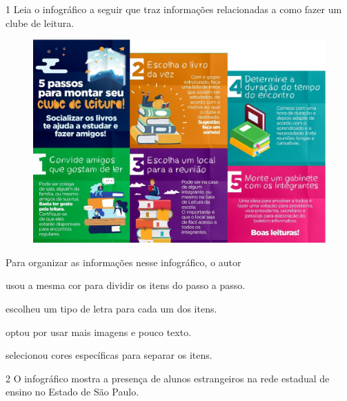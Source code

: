 \begin{conteudo}
\begin{conteudo}
\begin{conteudo}
\begin{conteudo}
\begin{conteudo}
\num{1} Leia o infográfico a seguir que traz informações relacionadas a
como fazer um clube de leitura.

\begin{figure}[htpb!]
\centering
\includegraphics[width=.8\textwidth]{media/image32.png}
\end{figure}


Para organizar as informações nesse infográfico, o autor

\begin{escolha}
\item usou a mesma cor para dividir os itens do passo a passo.

\item escolheu um tipo de letra para cada um dos itens.

\item optou por usar mais imagens e pouco texto.

\item selecionou cores específicas para separar os itens.
\end{escolha}

\pagebreak
\num{2} O infográfico mostra a presença de alunos estrangeiros na rede
estadual de ensino no Estado de São Paulo.


\end{conteudo}
\end{conteudo}
\end{conteudo}
\end{conteudo}
\end{conteudo}

